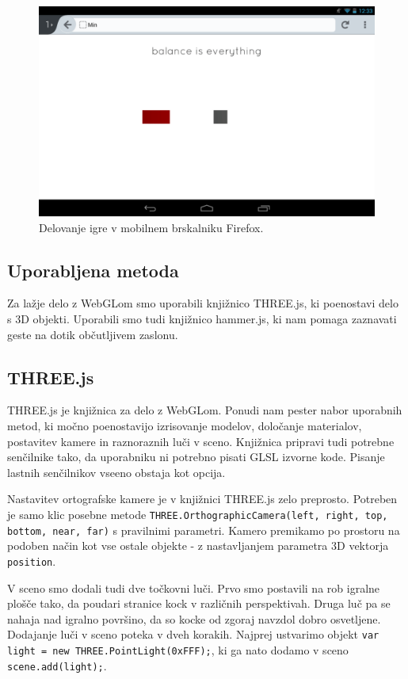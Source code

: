\begin{figure}
\begin{center}
\includegraphics[width=12cm]{pic/min-ff.png}
\end{center}
\caption{Delovanje igre v mobilnem brskalniku Firefox.}
\label{minff}
\end{figure}

\subsection{Uporabljena metoda}

Za lažje delo z WebGLom smo uporabili knjižnico THREE.js, ki poenostavi delo s 3D objekti. Uporabili smo tudi knjižnico hammer.js, ki nam pomaga zaznavati geste na dotik občutljivem zaslonu.

\subsection*{THREE.js}

THREE.js je knjižnica za delo z WebGLom. Ponudi nam pester nabor uporabnih metod, ki močno poenostavijo izrisovanje modelov, določanje materialov, postavitev kamere in raznoraznih luči v sceno. Knjižnica pripravi tudi potrebne senčilnike tako, da uporabniku ni potrebno pisati GLSL izvorne kode. Pisanje lastnih senčilnikov vseeno obstaja kot opcija.

Nastavitev ortografske kamere je v knjižnici THREE.js zelo preprosto. Potreben je samo klic posebne metode \texttt{THREE.OrthographicCamera(left, right, top, bottom, near, far)} s pravilnimi parametri. Kamero premikamo po prostoru na podoben način kot vse ostale objekte - z nastavljanjem parametra 3D vektorja \texttt{position}. 

V sceno smo dodali tudi dve točkovni luči. Prvo smo postavili na rob igralne plošče tako, da poudari stranice kock v različnih perspektivah. Druga luč pa se nahaja nad igralno površino, da so kocke od zgoraj navzdol dobro osvetljene. Dodajanje luči v sceno poteka v dveh korakih. Najprej ustvarimo objekt \texttt{var light =  new THREE.PointLight(0xFFF);}, ki ga nato dodamo v sceno \texttt{scene.add(light);}.

